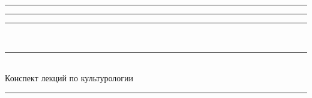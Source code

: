 \documentclass[12pt,notitlepage,pscyr]{hedlectures}
\begin{document}
  \begin{titlepage}
    \vspace*{\fill}
    \center
    \Large
    \rule[.5ex]{6em}{.5pt} \decothreeleft \rule{1em}{0pt}
    \decosix \rule{1em}{0pt}
    \decothreeright\ \rule[.5ex]{6em}{.5pt} \\[2ex]
    
    Конспект лекций по культурологии \\[1.5ex]
    
    \rule{18.2em}{.5pt}
    \vspace*{\fill}
  \end{titlepage}
  
   \newpage
  
\end{document}
